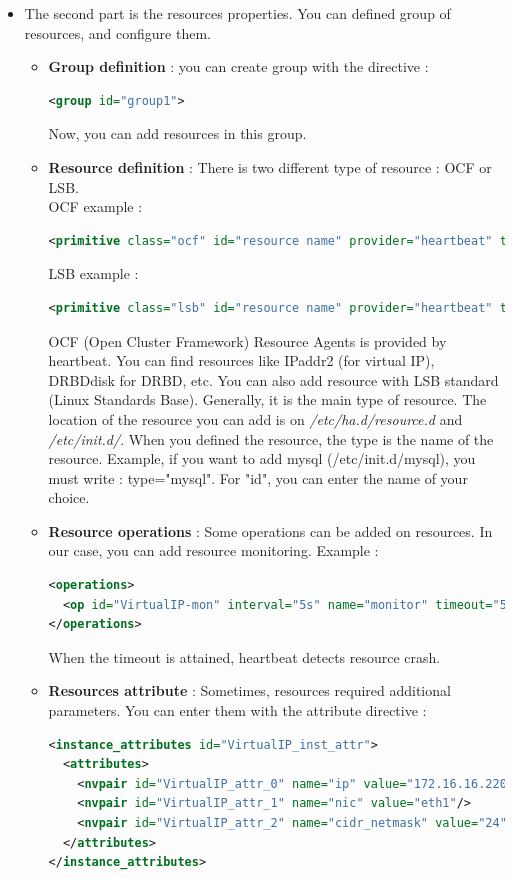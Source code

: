 \documentclass[a4paper,10pt]{report}
\begin{document}
\begin{itemize}
\item The second part is the resources properties. You can defined group of resources, and configure them.

\begin{itemize}
\item \textbf{Group definition} : you can create group with the directive :
\begin{lstlisting}[language=xml]
<group id="group1">
\end{lstlisting}
Now, you can add resources in this group.
\item \textbf{Resource definition} : There is two different type of resource : OCF or LSB.\\
OCF example : 
\begin{lstlisting}[language=xml]
<primitive class="ocf" id="resource name" provider="heartbeat" type="resource-name">
\end{lstlisting}
LSB example : 
\begin{lstlisting}[language=xml]
<primitive class="lsb" id="resource name" provider="heartbeat" type="resource-name">
\end{lstlisting}
OCF (Open Cluster Framework) Resource Agents is provided by heartbeat. You can find resources like IPaddr2 (for virtual IP), DRBDdisk for DRBD, etc.
You can also add resource with LSB standard (Linux Standards Base). Generally, it is the main type of resource. The location of the resource you can add is on \textit{/etc/ha.d/resource.d} and \textit{/etc/init.d/}.
When you defined the resource, the type is the name of the resource. Example, if you want to add mysql (/etc/init.d/mysql), you must write : type="mysql". For "id", you can enter the name of your choice.
\item \textbf{Resource operations} : Some operations can be added on resources. In our case, you can add resource monitoring. Example :
\begin{lstlisting}[language=xml]
<operations>
  <op id="VirtualIP-mon" interval="5s" name="monitor" timeout="5s"/>
</operations>
\end{lstlisting}
When the timeout is attained, heartbeat detects resource crash.
\item \textbf{Resources attribute} : Sometimes, resources required additional parameters. You can enter them with the attribute directive :
\begin{lstlisting}[language=xml]
<instance_attributes id="VirtualIP_inst_attr">
  <attributes>
    <nvpair id="VirtualIP_attr_0" name="ip" value="172.16.16.220"/>
    <nvpair id="VirtualIP_attr_1" name="nic" value="eth1"/>
    <nvpair id="VirtualIP_attr_2" name="cidr_netmask" value="24"/>
  </attributes>
</instance_attributes>
\end{lstlisting}


\end{itemize}
\end{itemize}
\end{document}

